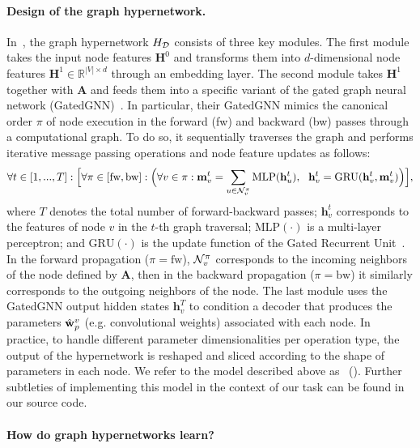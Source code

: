 \paragraph{Design of the graph hypernetwork.} In~\citep{zhang2018graph}, the graph hypernetwork $H_{\mathcal{D}}$ consists of three key modules. The first module takes the input node features $\mathbf{H}^{0}$ and transforms them into $d$-dimensional node features $\mathbf{H}^{1} \in \mathbb{R}^{|V| \times d}$ through an embedding layer. The second module takes $\mathbf{H}^{1}$ together with $\mathbf{A}$ and feeds them into a specific variant of the gated graph neural network (GatedGNN)~\citep{li2015gated}. In particular, their GatedGNN mimics the canonical order $\pi$ of node execution in the forward (fw) and backward (bw) passes through a computational graph.
To do so, it sequentially traverses the graph and performs iterative message passing operations and node feature updates as follows: 
%
\begin{align}
\label{eq:ghn_prop}
\forall t \in [1,...,T]:  \Big[ \forall \pi \in [\text{fw},\text{bw}]: \Big( \forall v \in \pi: \mathbf{m}^t_v = \sum\limits_{u \in \neigh_{v}^{\pi}} \text{MLP}(\mathbf{h}^{t}_u), \ \ \mathbf{\mathbf{h}}^{t}_v = \text{GRU}(\mathbf{h}_v^t, \mathbf{m}_v^t) \Big) \Big],
\end{align}
%   
where $T$ denotes the total number of forward-backward passes; $\mathbf{h}_v^t$ corresponds to the features of node $v$ in the $t$-th graph traversal; $\text{MLP}(\cdot)$ is a multi-layer perceptron; and $\text{GRU}(\cdot)$ is the update function of the Gated Recurrent Unit~\citep{cho2014learning}. In the forward propagation ($\pi=\text{fw}$), $\mathcal{N}_v^{\pi}$ corresponds to the incoming neighbors of the node defined by $\mathbf{A}$, then in the backward propagation ($\pi=\text{bw}$) it similarly corresponds to the outgoing neighbors of the node. The last module uses the GatedGNN output hidden states $\mathbf{h}_v^T$ to condition a decoder that produces the parameters $\hat{\mathbf{w}}_{p}^{v}$ (e.g. convolutional weights) associated with each node. 
In practice, to handle different parameter dimensionalities per operation type, the output of the hypernetwork is reshaped and sliced according to the shape of parameters in each node. We refer to the model described above as \ghnbase~(\fig{\ref{fig:ghn_overview}}). Further subtleties of implementing this model in the context of our task can be found in our source code.

\paragraph{How do graph hypernetworks learn?}

